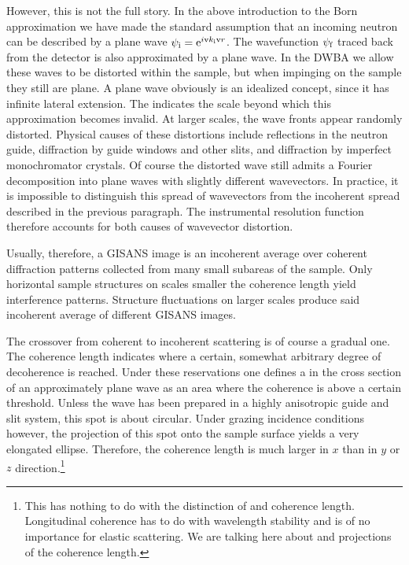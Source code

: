 However, this is not the full story.
In the above introduction to the Born approximation
we have made the standard assumption
that an incoming neutron can be described by a plane wave
$\psi_\si=\e^{i\k_\si\r}$.
The wavefunction $\psi_\sf$ traced back from the detector is also
approximated by a plane wave.
In the DWBA we allow these waves to be distorted within the sample,
but when impinging on the sample they still are plane.
A plane wave obviously is an idealized concept,
since it has infinite lateral extension.
The  indicates the scale
beyond which this approximation becomes invalid.
At larger scales, the wave fronts appear randomly distorted.
Physical causes of these distortions include
reflections in the neutron guide,
diffraction by guide windows and other slits,
and diffraction by imperfect monochromator crystals.
Of course the distorted wave still admits a Fourier decomposition
into plane waves with slightly different wavevectors.
In practice, it is impossible to distinguish this spread of wavevectors
from the incoherent spread described in the previous paragraph.
The instrumental resolution function therefore
accounts for both causes of wavevector distortion.
%

Usually, therefore, a GISANS image is an incoherent average
over coherent diffraction patterns collected from
many small subareas of the sample.
Only horizontal sample structures on scales smaller the coherence length
yield interference patterns.
Structure fluctuations on larger scales
produce said incoherent average of different GISANS images.

The crossover from coherent to incoherent scattering is of course
a gradual one.
The coherence length indicates where a certain, somewhat arbitrary degree
of decoherence is reached.
Under these reservations
one defines a 
in the cross section of an approximately plane wave
as an area where the coherence is above a certain threshold.
Unless the wave has been prepared in a highly anisotropic guide and slit system,
this spot is about circular.
Under grazing incidence conditions however,
the projection of this spot onto the sample surface
yields a very elongated ellipse.
Therefore, the coherence length is much larger in $x$ than
in $y$ or $z$ direction.\footnote
{This has nothing to do with the distinction of
   and  coherence length.
  Longitudinal coherence has to do with wavelength stability
  and is of no importance for elastic scattering.
  We are talking here about  and 
  projections of the  coherence length.}

